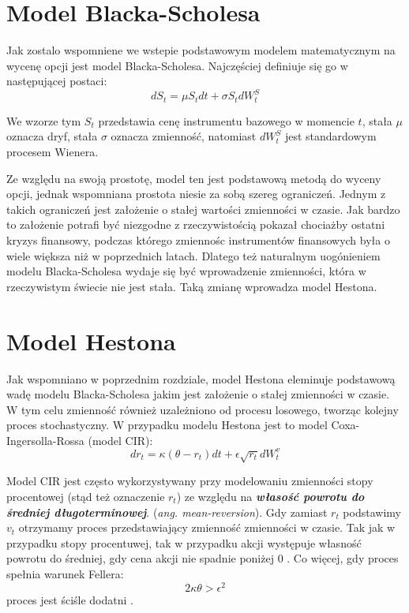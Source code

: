 \documentclass{pracamgr}
\begin{document}
\section{Model Blacka-Scholesa}

Jak zostalo wspomniene we wstepie podstawowym modelem matematycznym na wycenę opcji jest model Blacka-Scholesa. Najczęściej definiuje się go w następującej postaci:
\begin{equation}
dS_t  = \mu S_t dt + \sigma S_t dW^S_t
\end{equation}

We wzorze tym $S_t$ przedstawia cenę instrumentu bazowego w momencie $t$, stała $\mu$ oznacza dryf, stała $\sigma$ oznacza zmienność, natomiast $dW^S_t$ jest standardowym procesem Wienera.


Ze względu na swoją prostotę, model ten jest podstawową metodą do wyceny opcji, jednak wspomniana prostota niesie za sobą szereg ograniczeń. Jednym z takich ograniczeń jest założenie o stałej wartości zmienności w czasie. Jak bardzo to założenie potrafi być niezgodne z rzeczywistością pokazał chociażby ostatni kryzys finansowy, podczas którego zmiennośc instrumentów finansowych była o wiele większa niż w poprzednich latach. Dlatego też naturalnym uogónieniem modelu Blacka-Scholesa wydaje się być wprowadzenie zmienności, która w rzeczywistym świecie nie jest stała. Taką zmianę wprowadza model Hestona. 


\section{Model Hestona}
Jak wspomniano w poprzednim rozdziale, model Hestona eleminuje podstawową wadę modelu Blacka-Scholesa jakim jest założenie o stałej zmienności w czasie.
W tym celu zmienność również uzależniono od procesu losowego, tworząc kolejny proces stochastyczny. W przypadku modelu Hestona jest to model Coxa-Ingersolla-Rossa (model CIR):
\begin{equation}
dr_t  = \kappa (\theta  - r_t)dt + \epsilon \sqrt{r_t} dW_t^v 
\end{equation}

Model CIR jest często wykorzystywany przy modelowaniu zmienności stopy procentowej (stąd też oznaczenie $r_t$) ze względu na \textbf{\textit{własość powrotu do średniej długoterminowej}}. 
(\textit{ang. mean-reversion}). Gdy zamiast $r_t$ podstawimy $v_t$ otrzymamy proces przedstawiający zmienność zmienności w czasie. Tak jak w przypadku stopy procentuwej, tak w przypadku akcji występuje własność powrotu do średniej, gdy cena akcji nie spadnie poniżej 0 \cite{TestingMeanReversion}.
Co więcej, gdy proces spełnia warunek Fellera:
\begin{equation}
2 \kappa \theta > \epsilon^2
\end{equation}
proces jest ściśle dodatni \cite{TheLittleHestonTrap}.
\end{document}
